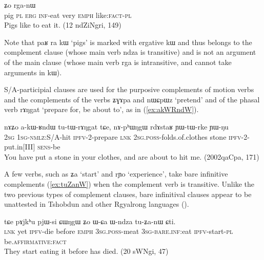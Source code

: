 \documentclass[oldfontcommands,oneside,a4paper,11pt]{article}
\newcommand{\ipa}[1]{{\phon#1}} %
\newcommand{\refb}[1]{(\ref{#1})}
\newcommand{\factual}[1]{\textsc{:fact}}
\begin{document}
 \begin{exe}
\ex \label{ex:erg.rga}
\gll
[\ipa{paʁ}  	\ipa{ra}  	\ipa{kɯ}  	\ipa{kɤ-ndza}]  	\ipa{wuma}  	\ipa{ʑo}  	\ipa{rga-nɯ}  \\
pig \textsc{pl} \textsc{erg} \textsc{inf}-eat very \textsc{emph}  like\factual{}-\textsc{pl} \\
 \glt Pigs like to eat it. (12 ndZiNgri, 149)
\end{exe}

Note that \ipa{paʁ} \ipa{ra} \ipa{kɯ} `pigs' is marked with ergative \ipa{kɯ} and thus belongs to the complement clause (whose main verb \ipa{ndza} is transitive) and is not an argument of the main clause (whose main verb \ipa{rga} is intransitive, and cannot take arguments in \ipa{kɯ}).


S/A-participial clauses are used for the purposive complements of motion verbs and the complements of the verbs \ipa{ʑɣɤpa} and \ipa{nɯɕpɯz} `pretend' and of the phasal verb \ipa{rɤŋgat} `prepare for, be about to', as in \refb{ex:akWRndW}.


 \begin{exe}
\ex \label{ex:akWRndW}
\gll
\ipa{nɤʑo}  	\ipa{a-kɯ-ʁndɯ}  	\ipa{tu-tɯ-rɤŋgat}  	\ipa{tɕe,}  	\ipa{nɤ-pʰɯŋgɯ}  	\ipa{rdɤstaʁ}  	\ipa{ɲɯ-tɯ-rke}  	\ipa{ɲɯ-ŋu}  \\
\textsc{2sg} \textsc{1sg-nmlz}:S/A-hit \textsc{ipfv}-2-prepare \textsc{lnk} \textsc{2sg.poss}-folds.of.clothes stone \textsc{ipfv}-2-put.in[III] \textsc{sens}-be \\
\glt You have put a stone in your clothes, and are about to hit me. (2002qaCpa, 171)
\end{exe}

A few verbs, such as \ipa{ʑa} `start' and \ipa{rɲo} `experience', take bare infinitive complements (\ref{ex:tuZanW}) when the complement verb is transitive. Unlike the two previous types of complement clauses, bare infinitival clauses appear to be unattested in Tshobdun and other Rgyalrong languages (\citealt{sun12complementation}).

 \begin{exe}
\ex \label{ex:tuZanW}
\gll
\ipa{tɕe}  	\ipa{pɤjkʰu}  	\ipa{pjɯ-si}   	\ipa{ɕɯŋgɯ}  	\ipa{ʑo}  	\ipa{ɯ-ɕa}  	\ipa{ɯ-ndza}  	\ipa{tu-ʑa-nɯ}  	\ipa{ɕti.}  \\
\textsc{lnk} yet \textsc{ipfv}-die before \textsc{emph} \textsc{3sg.poss}-meat \textsc{3sg-bare.inf}:eat \textsc{ipfv}-start-\textsc{pl}  be.\textsc{affirmative}\factual{} \\
 \glt They start eating it before has died. (20 sWNgi, 47)
\end{exe}
\end{document}
